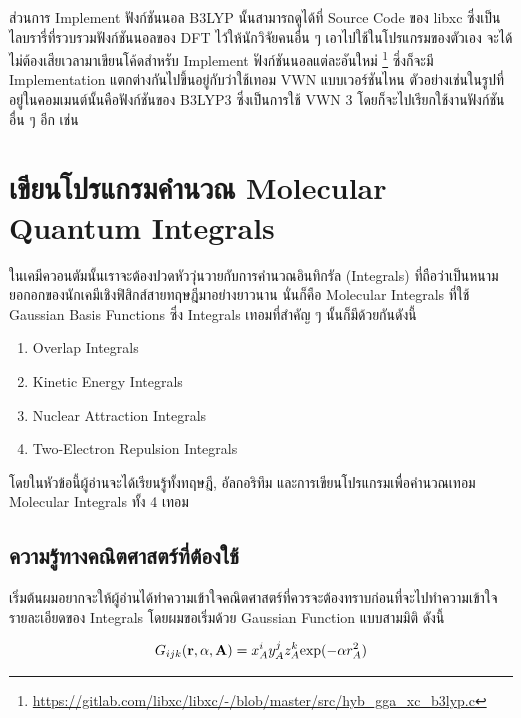 ส่วนการ Implement ฟังก์ชันนอล B3LYP นั้นสามารถดูได้ที่ Source Code ของ libxc ซึ่งเป็นไลบรารี่ที่รวบรวมฟังก์ชันนอลของ DFT
ไว้ให้นักวิจัยคนอื่น ๆ เอาไปใช้ในโปรแกรมของตัวเอง จะได้ไม่ต้องเสียเวลามาเขียนโค้ดสำหรับ Implement ฟังก์ชันนอลแต่ละอันใหม่%
\footnote{\url{https://gitlab.com/libxc/libxc/-/blob/master/src/hyb_gga_xc_b3lyp.c}} ซึ่งก็จะมี Implementation
แตกต่างกันไปขึ้นอยู่กับว่าใช้เทอม VWN แบบเวอร์ชันไหน ตัวอย่างเช่นในรูปที่อยู่ในคอมเมนต์นั้นคือฟังก์ชันของ B3LYP3 ซึ่งเป็นการใช้ VWN 3
โดยก็จะไปเรียกใช้งานฟังก์ชันอื่น ๆ อีก เช่น 

\section{เขียนโปรแกรมคำนวณ Molecular Quantum Integrals }

ในเคมีควอนตัมนั้นเราจะต้องปวดหัววุ่นวายกับการคำนวณอินทิกรัล (Integrals) ที่ถือว่าเป็นหนามยอกอกของนักเคมีเชิงฟิสิกส์สายทฤษฎีมาอย่างยาวนาน
นั่นก็คือ Molecular Integrals ที่ใช้ Gaussian Basis Functions ซึ่ง Integrals เทอมที่สำคัญ ๆ นั้นก็มีด้วยกันดังนี้

\begin{enumerate}[topsep=0pt,noitemsep]
  \item Overlap Integrals

  \item Kinetic Energy Integrals

  \item Nuclear Attraction Integrals

  \item Two-Electron Repulsion Integrals
\end{enumerate}

โดยในหัวข้อนี้ผู้อ่านจะได้เรียนรู้ทั้งทฤษฎี, อัลกอริทึม และการเขียนโปรแกรมเพื่อคำนวณเทอม Molecular Integrals ทั้ง 4 เทอม

\subsection{ความรู้ทางคณิตศาสตร์ที่ต้องใช้}

เริ่มต้นผมอยากจะให้ผู้อ่านได้ทำความเข้าใจคณิตศาสตร์ที่ควรจะต้องทราบก่อนที่จะไปทำความเข้าใจรายละเอียดของ Integrals โดยผมขอเริ่มด้วย
Gaussian Function แบบสามมิติ ดังนี้

\begin{equation}
  G_{ijk}(\mathbf{r}, \alpha, \mathbf{A})
  =
  x_A^i y_A^j z_A^k \hbox{exp}(-\alpha r_A^2)
\end{equation}

